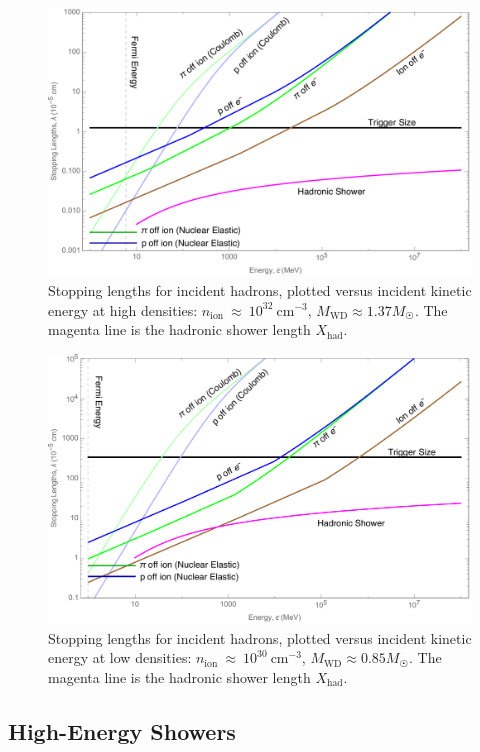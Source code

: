 \documentclass[twocolumn, preprintnumbers,amsmath,amssymb,prd, superscriptaddress]{revtex4}
\begin{document}
\begin{figure}
\includegraphics[scale=.3]{SPhighHad.pdf}
\caption{Stopping lengths for incident hadrons, plotted versus incident kinetic energy at high densities: $n_\text{ion}~\approx~10^{32}~\text{cm}^{-3}$, $M_\text{WD} \approx 1.37 M_{\astrosun}$. The magenta line is the hadronic shower length $X_\text{had}$.}
\label{fig:SPhighHad}
\end{figure}

\begin{figure}
\includegraphics[scale=.3]{SPlowHad.pdf}
\caption{Stopping lengths for incident hadrons, plotted versus incident kinetic energy at low densities: $n_\text{ion}~\approx~10^{30}~\text{cm}^{-3}$, $M_\text{WD} \approx 0.85 M_{\astrosun}$. The magenta line is the hadronic shower length $X_\text{had}$.}
\label{fig:SPlowHad}
\end{figure}

\subsection{High-Energy Showers}
\end{document}
